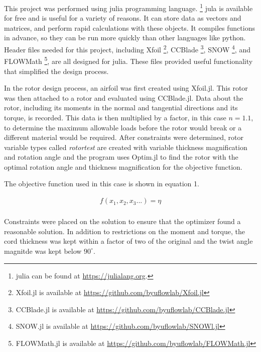 \documentclass[journal ]{new-aiaa}
\begin{document}
This project was performed using julia programming language. \footnote{julia can be found at \url{https://julialang.org}.} jula is available for free and is useful for a variety of reasons. It can store data as vectors and matrices, and perform rapid calculations with these objects. It compiles functions in advance, so they can be run more quickly than other languages like python. Header files needed for this project, including Xfoil \footnote{Xfoil.jl is available at \url{https://github.com/byuflowlab/Xfoil.jl}}, CCBlade \footnote{CCBlade.jl is available at \url{https://github.com/byuflowlab/CCBlade.jl}}, SNOW \footnote{SNOW.jl is available at \url{https://github.com/byuflowlab/SNOWl.jl}}, and FLOWMath \footnote{FLOWMath.jl is available at \url{https://github.com/byuflowlab/FLOWMath.jl}}, are all designed for julia. These files provided useful functionality that simplified the design process.

In the rotor design process, an airfoil was first created using Xfoil.jl. This rotor was then attached to a rotor and evaluated using CCBlade.jl. Data about the rotor, including its moments in the normal and tangential directions and its torque, is recorded. This data is then multiplied by a factor, in this case $n=1.1$, to determine the maximum allowable loads before the rotor would break or a different material would be required. After constraints were determined, rotor variable types called \emph{rotortest} are created with variable thickness magnification and rotation angle and the program uses Optim.jl to find the rotor with the optimal rotation angle and thickness magnification for the objective function.

The objective function used in this case is shown in equation 1. 

\begin{equation}
\begin{aligned}
\label{equation:1}
f(x_{1}, x_{2}, x_{3}...) = \eta \\
\end{aligned}
\end{equation}

Constraints were placed on the solution to ensure that the optimizer found a reasonable solution. In addition to restrictions on the moment and torque, the cord thickness was kept within a factor of two of the original and the twist angle magnitde was kept below $90^{\circ}$.
\end{document}
